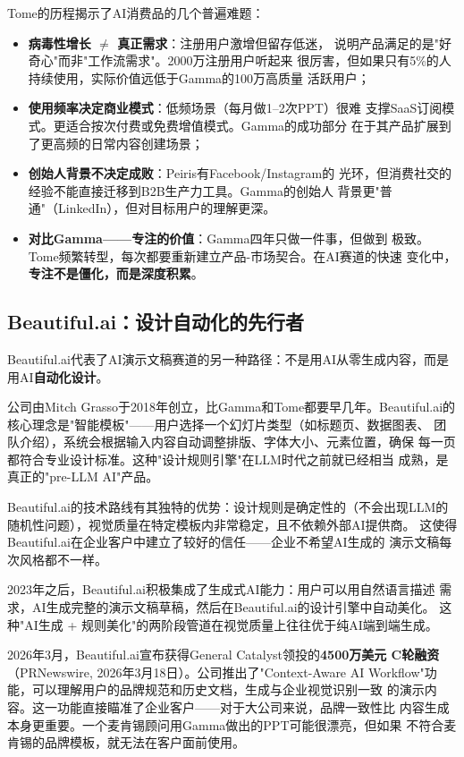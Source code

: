 \begin{corebox}
Tome的历程揭示了AI消费品的几个普遍难题：
\begin{itemize}
  \item \textbf{病毒性增长 $\neq$ 真正需求}：注册用户激增但留存低迷，
    说明产品满足的是"好奇心"而非"工作流需求"。2000万注册用户听起来
    很厉害，但如果只有5\%的人持续使用，实际价值远低于Gamma的100万高质量
    活跃用户；
  \item \textbf{使用频率决定商业模式}：低频场景（每月做1--2次PPT）很难
    支撑SaaS订阅模式。更适合按次付费或免费增值模式。Gamma的成功部分
    在于其产品扩展到了更高频的日常内容创建场景；
  \item \textbf{创始人背景不决定成败}：Peiris有Facebook/Instagram的
    光环，但消费社交的经验不能直接迁移到B2B生产力工具。Gamma的创始人
    背景更"普通"（LinkedIn），但对目标用户的理解更深。
  \item \textbf{对比Gamma——专注的价值}：Gamma四年只做一件事，但做到
    极致。Tome频繁转型，每次都要重新建立产品-市场契合。在AI赛道的快速
    变化中，\textbf{专注不是僵化，而是深度积累}。
\end{itemize}
\end{corebox}

\subsection{Beautiful.ai：设计自动化的先行者}
\label{subsec:beautifulai}

Beautiful.ai代表了AI演示文稿赛道的另一种路径：不是用AI从零生成内容，而是
用AI\textbf{自动化设计}。

公司由Mitch Grasso于2018年创立，比Gamma和Tome都要早几年。Beautiful.ai的
核心理念是"智能模板"——用户选择一个幻灯片类型（如标题页、数据图表、
团队介绍），系统会根据输入内容自动调整排版、字体大小、元素位置，确保
每一页都符合专业设计标准。这种"设计规则引擎"在LLM时代之前就已经相当
成熟，是真正的"pre-LLM AI"产品。

Beautiful.ai的技术路线有其独特的优势：设计规则是确定性的（不会出现LLM的
随机性问题），视觉质量在特定模板内非常稳定，且不依赖外部AI提供商。
这使得Beautiful.ai在企业客户中建立了较好的信任——企业不希望AI生成的
演示文稿每次风格都不一样。

2023年之后，Beautiful.ai积极集成了生成式AI能力：用户可以用自然语言描述
需求，AI生成完整的演示文稿草稿，然后在Beautiful.ai的设计引擎中自动美化。
这种"AI生成 + 规则美化"的两阶段管道在视觉质量上往往优于纯AI端到端生成。

2026年3月，Beautiful.ai宣布获得General Catalyst领投的\textbf{4500万美元
C轮融资}（PRNewswire, 2026年3月18日）。公司推出了"Context-Aware AI
Workflow"功能，可以理解用户的品牌规范和历史文档，生成与企业视觉识别一致
的演示内容。这一功能直接瞄准了企业客户——对于大公司来说，品牌一致性比
内容生成本身更重要。一个麦肯锡顾问用Gamma做出的PPT可能很漂亮，但如果
不符合麦肯锡的品牌模板，就无法在客户面前使用。


